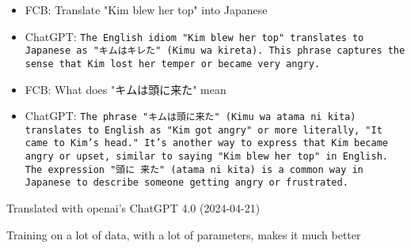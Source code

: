 \documentclass[a4paper,landscape,headrule,footrule,xetex]{foils}
\begin{document}
\makexeCJKactive
\begin{itemize}
\item FCB: Translate "Kim blew her top" into Japanese
\item ChatGPT:
\texttt{The English idiom "Kim blew her top" translates to Japanese as "キムはキレた" (Kimu wa kireta). This phrase captures the sense that Kim lost her temper or became very angry.}
\item FCB: What does "キムは頭に来た" mean
\item ChatGPT:  \texttt{The phrase "キムは頭に来た" (Kimu wa atama ni kita) translates to English as "Kim got angry" or more literally, "It came to Kim's head." It's another way to express that Kim became angry or upset, similar to saying "Kim blew her top" in English. \\
The expression  "頭に 来た" (atama ni kita) is a common way in Japanese to describe someone getting angry or frustrated.}
\end{itemize}
\makexeCJKinactive
\hfill Translated with openai's ChatGPT 4.0 (2024-04-21)

Training on a lot of data, with a lot of parameters, makes it much better





\end{document}
